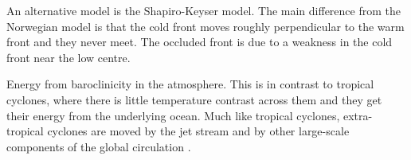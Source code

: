 
An alternative model is the Shapiro-Keyser model. The main difference from the Norwegian model is that the cold front moves roughly perpendicular to the warm front and they never meet. The occluded front is due to a weakness in the cold front near the low centre.


Energy from baroclinicity in the atmosphere. This is in contrast to tropical cyclones, where there is little temperature contrast across them and they get their energy from the underlying ocean. Much like tropical cyclones, extra-tropical cyclones are moved by the jet stream and by other large-scale components of the global circulation \citep{stull}.






